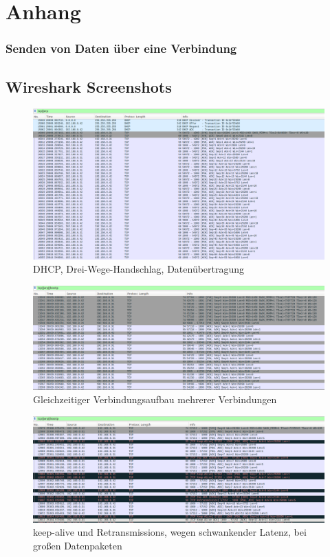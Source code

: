 
\chapter{Anhang}

\subsection{Senden von Daten über eine Verbindung}



\section{Wireshark Screenshots}
\begin{figure}
	\centering
	\includegraphics[width=1\textwidth]{Graphics/dhcpHD.png}
	\caption{DHCP, Drei-Wege-Handschlag, Datenübertragung}
	\label{DHCP}
	
\end{figure}

\begin{figure}[h]
	\centering
	\includegraphics[width=1\textwidth]{Graphics/MTCon.png}
	\caption{Gleichzeitiger Verbindungsaufbau mehrerer Verbindungen}
	\label{Multithread}
\end{figure}

\begin{figure}[h]
	\centering
	\includegraphics[width=1\textwidth]{Graphics/latency.png}
	\caption{keep-alive und Retransmissions, wegen schwankender Latenz, bei großen Datenpaketen}
	\label{ret}
\end{figure}